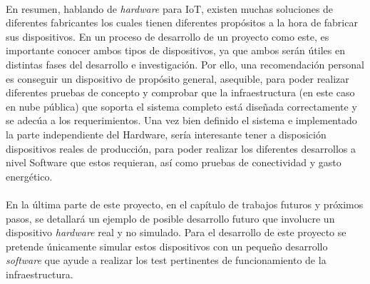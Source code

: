 \documentclass[../../memoria.tex]{subfiles}
\begin{document}
\paragraph{}
En resumen, hablando de \textit{hardware} para IoT, existen muchas soluciones de diferentes fabricantes los cuales tienen diferentes propósitos a la hora de fabricar sus dispositivos. En un proceso de desarrollo de un proyecto como este, es importante conocer ambos tipos de dispositivos, ya que ambos serán útiles en distintas fases del desarrollo e investigación. Por ello, una recomendación personal es conseguir un dispositivo de propósito general, asequible, para poder realizar diferentes pruebas de concepto y comprobar que la infraestructura (en este caso en nube pública) que soporta el sistema completo está diseñada correctamente y se adecúa a los requerimientos. Una vez bien definido el sistema e implementado la parte independiente del Hardware, sería interesante tener a disposición dispositivos reales de producción, para poder realizar los diferentes desarrollos a nivel Software que estos requieran, así como pruebas de conectividad y gasto energético.

\paragraph{}
En la última parte de este proyecto, en el capítulo de trabajos futuros y próximos pasos, se detallará un ejemplo de posible desarrollo futuro que involucre un dispositivo \textit{hardware} real y no simulado. Para el desarrollo de este proyecto se pretende únicamente simular estos dispositivos con un pequeño desarrollo \textit{software} que ayude a realizar los test pertinentes de funcionamiento de la infraestructura.
\end{document}
